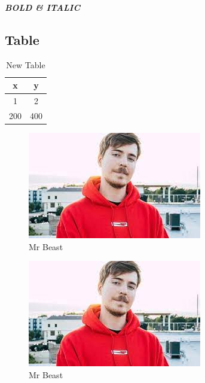 \documentclass[28pt,a4paper]{article}
\begin{document}
\textbf{\textit{BOLD & ITALIC}}

\subsection{Table}
\begin{table}[tbp]
    \centering
    \begin{tabular}{|c c|}
        \hline
        x & y \\
        \hline
        1 & 2 \\
        200 & 400 \\
        \hline
    \end{tabular}
    \caption{New Table}
    \label{tab:my_label}
\end{table}

\begin{figure}[htpb] %
    \centering
    \includegraphics[width=\textwidth]{mrbeast.jpg}
    \caption{Mr Beast}
    \label{fig:beast}
\end{figure}

\begin{figure}[htpb] %
    \centering
    \includegraphics{mrbeast.jpg}
    \caption{Mr Beast}
    \label{fig:beast}
\end{figure}
\end{document}
